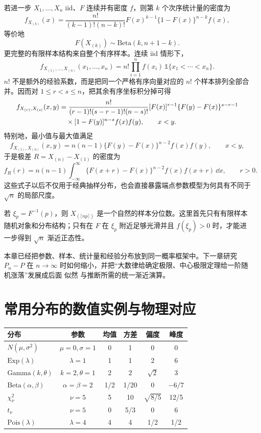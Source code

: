 若进一步 $X_1,\ldots,X_n$ iid、$F$ 连续并有密度 $f$，则第 $k$ 个次序统计量的密度为
\[
 f_{X_{(k)}}(x)
 =\frac{n!}{(k-1)!(n-k)!}
 F(x)^{k-1}\{1-F(x)\}^{n-k}f(x),
\]
等价地
\[
 F(X_{(k)})\sim\mathrm{Beta}(k,n+1-k).
\]
更完整的有限样本结构来自整个有序样本。连续 iid 情形下，
\begin{equation}\label{eq:math-stat-ordered-sample-joint-density}
 f_{X_{(1)},\ldots,X_{(n)}}(x_1,\ldots,x_n)
 =n!\prod_{i=1}^nf(x_i)\,
 \mathds{1}\{x_1<\cdots<x_n\}.
\end{equation}
$n!$ 不是额外的经验系数，而是把同一个严格有序向量对应的 $n!$ 个样本排列全部合并。因而对 $1\le r<s\le n$，把其余有序坐标积分掉可得
\begin{align*}
 f_{X_{(r)},X_{(s)}}(x,y)
 &=\frac{n!}{(r-1)!(s-r-1)!(n-s)!}
 [F(x)]^{r-1}\{F(y)-F(x)\}^{s-r-1}\notag\\
 &\quad\times[1-F(y)]^{n-s}f(x)f(y),
 \qquad x<y.
\end{align*}
特别地，最小值与最大值满足
\[
 f_{X_{(1)},X_{(n)}}(x,y)
 =n(n-1)\{F(y)-F(x)\}^{n-2}f(x)f(y),
 \qquad x<y,
\]
于是极差 $R=X_{(n)}-X_{(1)}$ 的密度为
\[
 f_R(r)
 =n(n-1)\int_{-\infty}^{\infty}
 \{F(x+r)-F(x)\}^{n-2}f(x)f(x+r)\,\dd x,
 \qquad r>0.
\]
这些式子以后不仅用于经典抽样分布，也会直接暴露端点参数模型为何具有不同于 $\sqrt n$ 的局部尺度。

若 $\xi_p=F^{-1}(p)$，则 $X_{(\lceil np\rceil)}$ 是一个自然的样本分位数。这里首先只有有限样本随机对象和分布结构；只有在 $F$ 在 $\xi_p$ 附近足够光滑并且 $f(\xi_p)>0$ 时，才能进一步得到 $\sqrt n$ 渐近正态性。

本章已经把参数、样本、统计量和经验分布放到同一概率框架中。下一章研究 $P_n-P$ 在 $n\to\infty$ 时如何缩小，并把“大数律给确定极限、中心极限定理给一阶随机涨落”发展成后面 似然 与推断所需的统一渐近演算。

\section{常用分布的数值实例与物理对应}\label{sec:probability-examples}
\begin{center}
\begin{tabular}{lccccc}
\hline
分布 & 参数 & 均值 & 方差 & 偏度 & 峰度 \\
\hline
$N(\mu,\sigma^2)$ & $\mu=0,\sigma=1$ & 0 & 1 & 0 & 0 \\
$\mathrm{Exp}(\lambda)$ & $\lambda=1$ & 1 & 1 & 2 & 6 \\
$\mathrm{Gamma}(k,\theta)$ & $k=2,\theta=1$ & 2 & 2 & $\sqrt2$ & 3 \\
$\mathrm{Beta}(\alpha,\beta)$ & $\alpha=\beta=2$ & 1/2 & 1/20 & 0 & $-6/7$ \\
$\chi^2_\nu$ & $\nu=5$ & 5 & 10 & $\sqrt{8/5}$ & 12/5 \\
$t_\nu$ & $\nu=5$ & 0 & 5/3 & 0 & 6 \\
$\mathrm{Pois}(\lambda)$ & $\lambda=4$ & 4 & 4 & 1/2 & 1/2 \\
\hline
\end{tabular}
\end{center}


